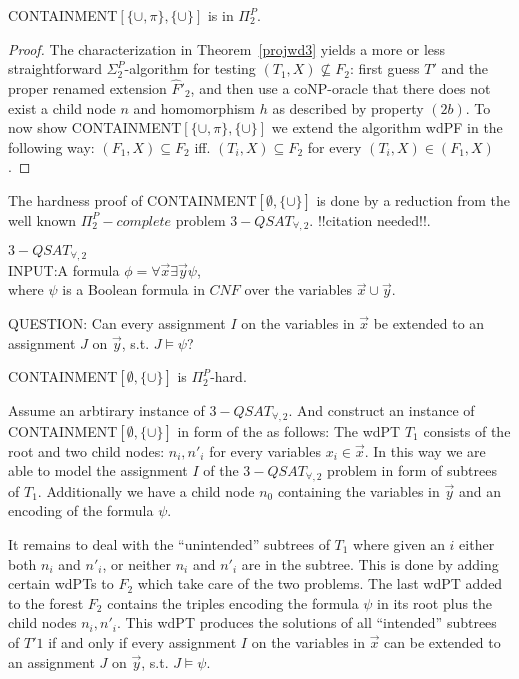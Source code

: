 \begin{theorem}
	CONTAINMENT$[\{\cup,\pi\},\{\cup\}]$ is in $\Pi^P_2$.
\end{theorem}
\begin{proof}
	The characterization in Theorem~\ref{projwd3} yields a more or less
	straightforward $\Sigma^P_2$-algorithm for testing $(T_1,X) \not\subseteq
	F_2$: first guess $T'$ and the proper renamed extension $\hat{F}'_2$, and
	then use a coNP-oracle that there does not exist a child node $n$ and
	homomorphism $h$ as described by property $(2b)$.
	To now show  CONTAINMENT$[\{\cup,\pi\},\{\cup\}]$ we extend the algorithm
	wdPF in the following way: $(F_1,X) \subseteq F_2$ iff. $(T_i,X) \subseteq
	F_2$ for every $(T_i,X) \in (F_1,X)$.
\end{proof}

The hardness proof of CONTAINMENT$[\emptyset,\{\cup\}]$ is done by a reduction from
the well known $\Pi^P_2-complete$ problem $3-QSAT_{\forall,2}$. !!citation
needed!!.

\begin{framed}\noindent $3-QSAT_{\forall,2}$\\
	INPUT:A formula $\phi= \forall \vec{x}\exists \vec{y} \psi$,\\
	where $\psi$ is a Boolean formula in $CNF$ over the variables
	$\vec{x}\cup\vec{y}$.
	
	QUESTION: Can every assignment $I$ on the variables in $\vec{x}$ be extended
	to an assignment $J$ on $\vec{y}$, s.t. $J \models \psi$?
\end{framed}


\begin{theorem}\label{cemptycup}
	CONTAINMENT$[\emptyset,\{\cup\}]$ is $\Pi^P_2$-hard.
\end{theorem}
\begin{proofidea}
	Assume an arbtirary instance of $3-QSAT_{\forall,2}$. And construct an
	instance of CONTAINMENT$[\emptyset,\{\cup\}]$ in form of the as follows: The wdPT $T_1$
	consists of the root and two child nodes: $n_i, n'_i$ for every variables
	$x_i \in \vec{x}$. In this way we are able to model the assignment $I$ of
	the $3-QSAT_{\forall,2}$ problem in form of subtrees of $T_1$. 
	Additionally we have a child node $n_0$ containing the
	variables in $\vec{y}$ and an encoding of the formula $\psi$. 
	
	It remains to deal with the ``unintended'' subtrees of $T_1$ where given an
	$i$ either both $n_i$ and $n'_i$, or neither $n_i$ and $n'_i$ are in the subtree.
	This is done by adding certain wdPTs to $F_2$ which take care of the two
	problems. The last wdPT added to the forest $F_2$ contains the triples
	encoding the formula $\psi$ in its root plus the child nodes $n_i,n'_i$.
	This wdPT produces the solutions of all ``intended'' subtrees of $T'1$ if
	and only if every assignment $I$ on the variables in $\vec{x}$ can be
	extended to an assignment $J$ on $\vec{y}$, s.t. $J \models \psi$.
\end{proofidea}

